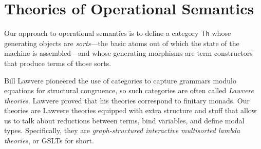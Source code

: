 \documentclass{article}
\newcommand{\mycomment}[1]{}
\begin{document}
\mycomment{

    \begin{itemize}
        \item {\bf We can compile GSLTs to Rholang.} We outline a strategy for automatic compilation of GSLTs to Rholang in section \ref{comp_to_rholang}.
        \item {\bf We can generate a type system from a GSLT.} There are automatic ways to generate a type system from a category~\cite{WilliamsStay2021}. The generated type system allows for the expression of both spatial and behavioral properties of code that can be typechecked before interpretation.
        \item {\bf Application programming and concurrency.} Rholang seamlessly combines synchronous datatypes with the best-studied approach to concurrency, the $\pi$-calculus, to provide an efficient, transactional knowledge store.
        \item {\bf Reasoning about backtracking.} The MORK project has extracted the fact database into a blindingly efficient library called PathMap, with not only clear semantics but also clear complexity guarantees.  It lacks, however, any form of concurrency or notion of transaction.  We propose adding MORK to Rholang, both as a synchronous datatype as well as an augmentation of Rholang's pattern matching capabilities.
        \item {\bf Spaces remain isolated by default.} When using spaces as a datatype, they remain separate by default, just like maps, sets, and lists are.
        \item {\bf Rholang is optimal.}  In section \ref{optimality_proof} we prove that any other generic solution must be within a constant factor of the performance of Rholang.
    \end{itemize}

}

\section{Theories of Operational Semantics}

Our approach to operational semantics is to define a category $\mathsf{Th}$ whose generating objects are \emph{sorts}---the basic atoms out of which the state of the machine is assembled---and whose generating morphisms are term constructors that produce terms of those sorts.

Bill Lawvere pioneered the use of categories to capture grammars modulo equations for structural congruence, so such categories are often called \emph{Lawvere theories}. Lawvere proved that his theories correspond to finitary monads. Our theories are Lawvere theories equipped with extra structure and stuff that allow us to talk about reductions between terms, bind variables, and define modal types.  Specifically, they are \emph{graph-structured interactive multisorted lambda theories}, or GSLTs for short.
\end{document}
